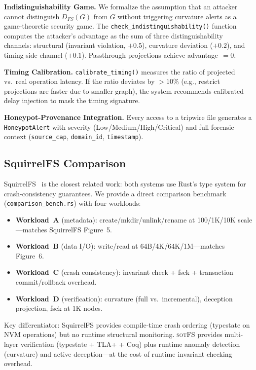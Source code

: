 \documentclass[11pt,a4paper]{article}
\theoremstyle{definition}
\newcommand{\sotfs}{\textsc{sotFS}}
\begin{document}
\textbf{Indistinguishability Game.}  We formalize the assumption that an
attacker cannot distinguish $D_{FS}(G)$ from $G$ without triggering curvature
alerts as a game-theoretic security game.  The \texttt{check\_indistinguishability()}
function computes the attacker's advantage as the sum of three distinguishability
channels: structural (invariant violation, $+0.5$), curvature deviation ($+0.2$),
and timing side-channel ($+0.1$).  Passthrough projections achieve advantage~$=0$.

\textbf{Timing Calibration.}  \texttt{calibrate\_timing()} measures the ratio of
projected vs.\ real operation latency.  If the ratio deviates by $>10\%$
(e.g., restrict projections are faster due to smaller graph), the system
recommends calibrated delay injection to mask the timing signature.

\textbf{Honeypot-Provenance Integration.}  Every access to a tripwire file
generates a \texttt{HoneypotAlert} with severity
(Low/Medium/High/Critical) and full forensic context
(\texttt{source\_cap}, \texttt{domain\_id}, \texttt{timestamp}).

\subsection{SquirrelFS Comparison}

SquirrelFS~\cite{kadekodi2024} is the closest related work: both systems use
Rust's type system for crash-consistency guarantees.  We provide a direct
comparison benchmark (\texttt{comparison\_bench.rs}) with four workloads:
\begin{itemize}[nosep]
\item \textbf{Workload~A} (metadata): create/mkdir/unlink/rename at
  100/1K/10K scale---matches SquirrelFS Figure~5.
\item \textbf{Workload~B} (data I/O): write/read at 64B/4K/64K/1M---matches Figure~6.
\item \textbf{Workload~C} (crash consistency): invariant check + fsck +
  transaction commit/rollback overhead.
\item \textbf{Workload~D} (verification): curvature (full vs.\ incremental),
  deception projection, fsck at 1K nodes.
\end{itemize}

Key differentiator: SquirrelFS provides compile-time crash ordering (typestate
on NVM operations) but no runtime structural monitoring.  \sotfs{} provides
multi-layer verification (typestate + TLA+ + Coq) plus runtime anomaly
detection (curvature) and active deception---at the cost of runtime invariant
checking overhead.
\end{document}
